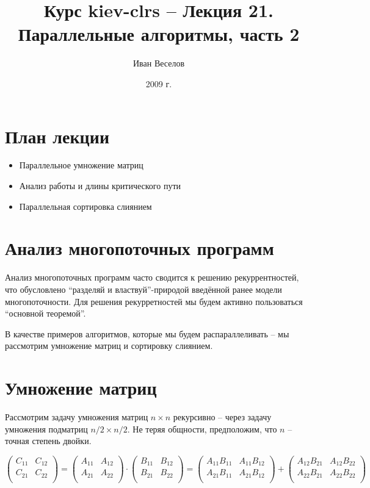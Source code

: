 \documentclass[a4paper,11pt]{article}
\author{Иван Веселов}
\title{Курс kiev-clrs -- Лекция 21. Параллельные алгоритмы, часть 2}
\date{2009 г.}
\begin{document}
\maketitle
\tableofcontents
\newpage

\setlength{\parskip}{1ex plus 0.5ex minus 0.2ex}

\section{План лекции}
\begin{itemize}
\item Параллельное умножение матриц
\item Анализ работы и длины критического пути
\item Параллельная сортировка слиянием
\end{itemize}

\section{Анализ многопоточных программ}

Анализ многопоточных программ часто сводится к решению рекуррентностей, что
обусловлено ``разделяй и властвуй''-природой введённой ранее модели
многопоточности. Для решения рекурретностей мы будем активно пользоваться
``основной теоремой''.

В качестве примеров алгоритмов, которые мы будем распараллеливать -- мы
рассмотрим умножение матриц и сортировку слиянием.

\section{Умножение матриц}

Рассмотрим задачу умножения матриц $n \times n$ рекурсивно -- через задачу
умножения подматриц $n/2 \times n/2$. Не теряя общности, предположим, что $n$ --
точная степень двойки.

\begin{equation*}
\begin{pmatrix}
C_{11} & C_{12} \\
C_{21} & C_{22} \\
\end{pmatrix}
=
\begin{pmatrix}
A_{11} & A_{12} \\
A_{21} & A_{22} \\
\end{pmatrix}
\cdot
\begin{pmatrix}
B_{11} & B_{12} \\
B_{21} & B_{22} \\
\end{pmatrix}
=
\begin{pmatrix}
A_{11}B_{11} & A_{11}B_{12} \\
A_{21}B_{11} & A_{21}B_{12} \\
\end{pmatrix}
+
\begin{pmatrix}
A_{12}B_{21} & A_{12}B_{22} \\
A_{22}B_{21} & A_{22}B_{22} \\
\end{pmatrix}
\end{equation*}
\end{document}
